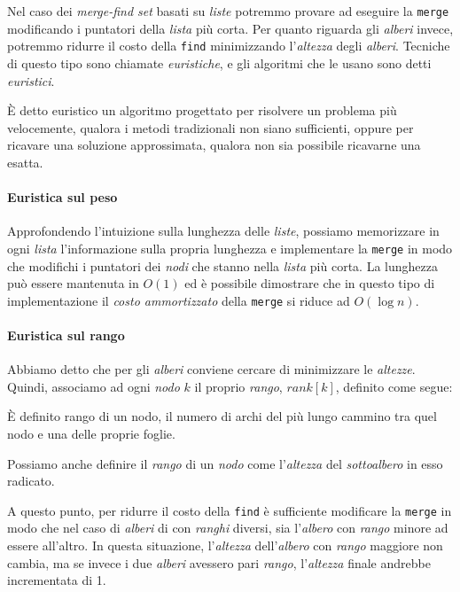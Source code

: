 Nel caso dei \emph{merge-find set} basati su \emph{liste} potremmo provare ad
eseguire la \texttt{merge} modificando i puntatori della \emph{lista} più corta.
Per quanto riguarda gli \emph{alberi} invece, potremmo ridurre il costo della
\texttt{find} minimizzando l'\emph{altezza} degli \emph{alberi}. Tecniche di
questo tipo sono chiamate \emph{euristiche}, e gli algoritmi che le usano sono
detti \emph{euristici}.

\begin{definition}
    È detto euristico un algoritmo progettato per risolvere un problema più
    velocemente, qualora i metodi tradizionali non siano sufficienti, oppure per
    ricavare una soluzione approssimata, qualora non sia possibile ricavarne una
    esatta.
\end{definition}

\paragraph{Euristica sul peso}
Approfondendo l'intuizione sulla lunghezza delle \emph{liste}, possiamo
memorizzare in ogni \emph{lista} l'informazione sulla propria lunghezza e
implementare la \texttt{merge} in modo che modifichi i puntatori dei \emph{nodi}
che stanno nella \emph{lista} più corta. La lunghezza può essere mantenuta in
$O(1)$ ed è possibile dimostrare che in questo tipo di implementazione il
\emph{costo ammortizzato} della \texttt{merge} si riduce ad $O(\log n)$.

\paragraph{Euristica sul rango}
Abbiamo detto che per gli \emph{alberi} conviene cercare di minimizzare le
\emph{altezze}. Quindi, associamo ad ogni \emph{nodo} $k$ il proprio
\emph{rango}, $rank[k]$, definito come segue:

\begin{definition}
    È definito rango di un nodo, il numero di archi del più lungo cammino tra
    quel nodo e una delle proprie foglie.
\end{definition}
\begin{note}
    Possiamo anche definire il \emph{rango} di un \emph{nodo} come
    l'\emph{altezza} del \emph{sottoalbero} in esso radicato.
\end{note}

\noindent
A questo punto, per ridurre il costo della \texttt{find} è sufficiente
modificare la \texttt{merge} in modo che nel caso di \emph{alberi} di con
\emph{ranghi} diversi, sia l'\emph{albero} con \emph{rango} minore ad essere
 all'altro. In questa situazione, l'\emph{altezza}
dell'\emph{albero} con \emph{rango} maggiore non cambia, ma se invece i due
\emph{alberi} avessero pari \emph{rango}, l'\emph{altezza} finale andrebbe
incrementata di 1.

